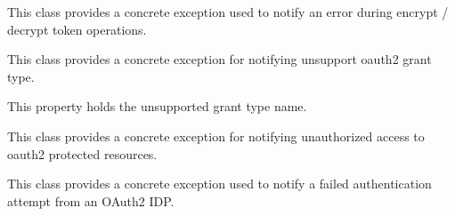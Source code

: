 \documentclass[letterpaper,10pt,english]{sphinxmanual}
\begin{document}
\begin{fulllineitems}
\label{features/oauth2/technical_summary:fantastico.oauth2.exceptions.OAuth2TokenEncryptionError}
This class provides a concrete exception used to notify an error during encrypt / decrypt token operations.

\end{fulllineitems}


\begin{fulllineitems}
\label{features/oauth2/technical_summary:fantastico.oauth2.exceptions.OAuth2UnsupportedGrantError}
This class provides a concrete exception for notifying unsupport oauth2 grant type.

\begin{fulllineitems}
\label{features/oauth2/technical_summary:fantastico.oauth2.exceptions.OAuth2UnsupportedGrantError.handler_type}
This property holds the unsupported grant type name.

\end{fulllineitems}


\end{fulllineitems}


\begin{fulllineitems}
\label{features/oauth2/technical_summary:fantastico.oauth2.exceptions.OAuth2UnauthorizedError}
This class provides a concrete exception for notifying unauthorized access to oauth2 protected resources.

\end{fulllineitems}


\begin{fulllineitems}
\label{features/oauth2/technical_summary:fantastico.oauth2.exceptions.OAuth2AuthenticationError}
This class provides a concrete exception used to notify a failed authentication attempt from an OAuth2 IDP.

\end{fulllineitems}
\end{document}
